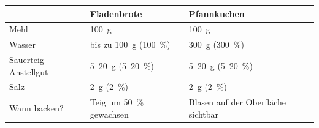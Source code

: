 \begin{tabular}{@{}lll@{}}
\toprule
                  & \textbf{Fladenbrote}           & \textbf{Pfannkuchen}          \\ \midrule
Mehl             & \qty{100}{g}                   & \qty{100}{g}                       \\
Wasser             & bis zu \qty{100}{g} (\qty{100}{\percent})     & \qty{300}{g} (\qty{300}{\percent})               \\
Sauerteig-Anstellgut & 5--\qty{20}{g} (5--\qty{20}{\percent})       & 5--\qty{20}{g} (5--\qty{20}{\percent})           \\
Salz              & \qty{2}{g} (\qty{2}{\percent})               & \qty{2}{g} (\qty{2}{\percent})                   \\
        Wann backen?        & Teig um \qty{50}{\percent} gewachsen & Blasen auf der Oberfläche sichtbar \\ \bottomrule
\end{tabular}
